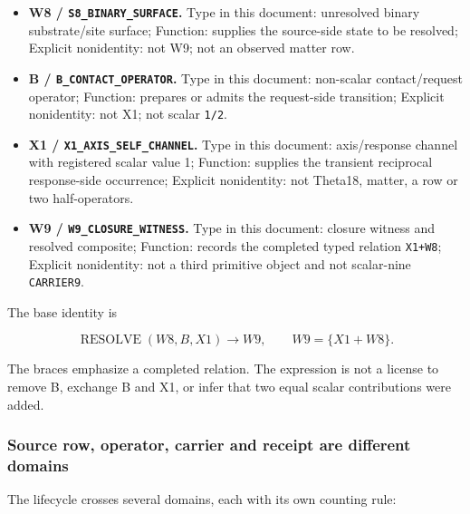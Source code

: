 \begin{itemize}
\tightlist
\item
  \textbf{W8 / \texttt{S8\_BINARY\_SURFACE}.} Type in this document:
  unresolved binary substrate/site surface; Function: supplies the
  source-side state to be resolved; Explicit nonidentity: not W9; not an
  observed matter row.
\item
  \textbf{B / \texttt{B\_CONTACT\_OPERATOR}.} Type in this document:
  non-scalar contact/request operator; Function: prepares or admits the
  request-side transition; Explicit nonidentity: not X1; not scalar
  \texttt{1/2}.
\item
  \textbf{X1 / \texttt{X1\_AXIS\_SELF\_CHANNEL}.} Type in this document:
  axis/response channel with registered scalar value 1; Function:
  supplies the transient reciprocal response-side occurrence; Explicit
  nonidentity: not Theta18, matter, a row or two half-operators.
\item
  \textbf{W9 / \texttt{W9\_CLOSURE\_WITNESS}.} Type in this document:
  closure witness and resolved composite; Function: records the
  completed typed relation \texttt{X1+W8}; Explicit nonidentity: not a
  third primitive object and not scalar-nine \texttt{CARRIER9}.
\end{itemize}

The base identity is

\[
\operatorname{RESOLVE}(W8,B,X1)\longrightarrow W9,
\qquad W9=\{X1+W8\}.
\]

The braces emphasize a completed relation. The expression is not a
license to remove B, exchange B and X1, or infer that two equal scalar
contributions were added.

\subsubsection{Source row, operator, carrier and receipt are different
domains}\label{viii-ch05-source-row-operator-carrier-and-receipt-are-different-domains}

The lifecycle crosses several domains, each with its own counting rule:


